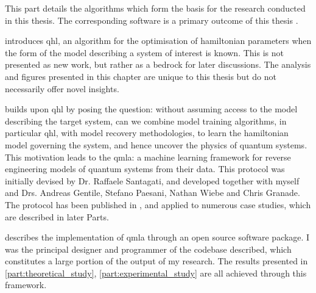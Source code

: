 
This part details the algorithms which form the basis for the research conducted in this thesis. 
The corresponding software is a primary outcome of this thesis \cite{flynn2021Quantum, flynn2021QMLA, qmla_docs}.

\par 
\vspace{1cm}

 introduces \gls{qhl}, an algorithm for the optimisation of \gls{hamiltonian} parameters
    when the form of the model describing a system of interest is known. 
    This is not presented as new work, but rather as a bedrock for later discussions. 
    The analysis and figures presented in this chapter are unique to this thesis but do not necessarily offer novel insights. 
\par 
\vspace{1cm}
 builds upon \gls{qhl} by posing the question: 
    without assuming access to the model describing the target system, can we combine model training algorithms, 
    in particular \gls{qhl}, with model recovery methodologies, to learn the \gls{hamiltonian} model 
    governing the system, and hence uncover the physics of quantum systems. 
    This motivation leads to the \gls{qmla}: 
    a machine learning framework for reverse engineering models of quantum systems from their data.
    This protocol was initially devised by Dr. Raffaele Santagati, 
    and developed together with myself and Drs. Andreas Gentile, Stefano Paesani, Nathan Wiebe and Chris Granade. 
    The protocol has been published in \cite{gentile2020learning}, 
    and applied to numerous case studies, which are described in later Parts. 
\par
\vspace{1cm}

 describes the implementation of \gls{qmla} through an open source software package. 
I was the principal designer and programmer of the codebase described, which constitutes a large portion of the output of my research. 
The results presented in \cref{part:theoretical_study}, \cref{part:experimental_study} are all achieved through this framework. 
